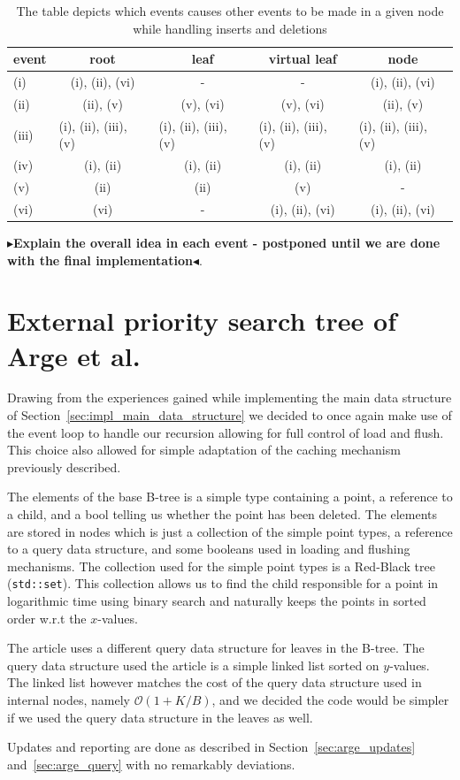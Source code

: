 \documentclass[twoside,11pt,openright]{report}
\newcommand{\todo}[1]{{\color[rgb]{.5,0,0}\textbf{$\blacktriangleright$#1$\blacktriangleleft$}}}
\begin{document}
\begin{table}[]
\centering
\caption{The table depicts which events causes other events to be made in a given node while handling inserts and deletions}
\label{table:dependency_matrix}
\begin{tabular}{lcccc}
\hline
event & root & leaf & virtual leaf & node \\ \hline
(i) & {\color[HTML]{333333} (i), (ii), (vi)} & - & - & (i), (ii), (vi) \\
(ii)  & (ii), (v) & (v), (vi) & (v), (vi) & (ii), (v) \\
(iii)  & \multicolumn{1}{l}{(i), (ii), (iii), (v)} & \multicolumn{1}{l}{(i), (ii), (iii), (v)} & \multicolumn{1}{l}{(i), (ii), (iii), (v)} & \multicolumn{1}{l}{(i), (ii), (iii), (v)} \\
(iv) & (i), (ii) & (i), (ii) & (i), (ii) & (i), (ii) \\
(v)  & (ii) & (ii) & (v) & - \\
(vi)  & (vi) & - & (i), (ii), (vi) & (i), (ii), (vi)
\end{tabular}
\end{table}

\todo{Explain the overall idea in each event - postponed until we are done with the final implementation}.

\section{External priority search tree of Arge et al.}
Drawing from the experiences gained while implementing the main data structure of Section~\ref{sec:impl_main_data_structure} we decided to once again make use of the event loop to handle our recursion allowing for full control of load and flush. This choice also allowed for simple adaptation of the caching mechanism previously described.

The elements of the base B-tree is a simple type containing a point, a reference to a child, and a bool telling us whether the point has been deleted. The elements are stored in nodes which is just a collection of the simple point types, a reference to a query data structure, and some booleans used in loading and flushing mechanisms. The collection used for the simple point types is a Red-Black tree (\texttt{std::set}). This collection allows us to find the child responsible for a point in logarithmic time using binary search and naturally keeps the points in sorted order w.r.t the $x$-values.

The article uses a different query data structure for leaves in the B-tree. The query data structure used the article is a simple linked list sorted on $y$-values. The linked list however matches the cost of the query data structure used in internal nodes, namely $\mathcal{O}(1 + K/B)$, and we decided the code would be simpler if we used the query data structure in the leaves as well.

Updates and reporting are done as described in Section~\ref{sec:arge_updates} and~\ref{sec:arge_query} with no remarkably deviations.


\end{document}
